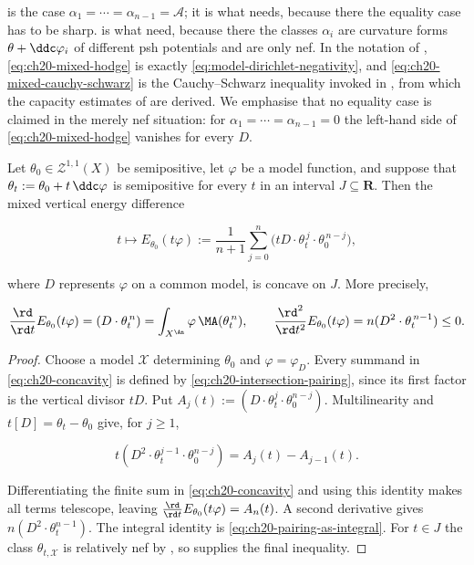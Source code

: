 \begin{remark}
\label{rem:ch20-hodge-uses}
 is the case
$\alpha_1=\cdots=\alpha_{n-1}=\mathcal A$; it is what
 needs, because there the equality case has to be
sharp.   is what
 need, because there the
classes $\alpha_i$ are curvature forms $\theta+\ddc\varphi_i$ of
different psh potentials and are only nef.  In the notation of
, \eqref{eq:ch20-mixed-hodge} is
exactly \eqref{eq:model-dirichlet-negativity}, and
\eqref{eq:ch20-mixed-cauchy-schwarz} is the Cauchy--Schwarz inequality
invoked in , from which the capacity
estimates of  are derived.  We emphasise that no
equality case is claimed in the merely nef situation: for
$\alpha_1=\cdots=\alpha_{n-1}=0$ the left-hand side of
\eqref{eq:ch20-mixed-hodge} vanishes for every $D$.
\end{remark}

\begin{corollary}
\label{cor:ch20-concavity}
Let $\theta_0\in\mathcal Z^{1,1}(X)$ be semipositive, let $\varphi$ be a
model function, and suppose that $\theta_t:=\theta_0+t\,\ddc\varphi$ is
semipositive for every $t$ in an interval $J\subseteq\mathbf R$.  Then
the mixed vertical energy difference

\begin{equation}
\label{eq:ch20-concavity}
 t\longmapsto E_{\theta_0}(t\varphi)
 :=\frac1{n+1}\sum_{j=0}^n
   \bigl(tD\cdot\theta_t^{\,j}\cdot\theta_0^{\,n-j}\bigr),
\end{equation}

where $D$ represents $\varphi$ on a common model, is concave on $J$.
More precisely,

\[
 \frac{\rd}{\rd t}E_{\theta_0}(t\varphi)
   =(D\cdot\theta_t^{\,n})
   =\int_{X^{\An}}\varphi\,\MA(\theta_t^{\,n}),
 \qquad
 \frac{\rd^2}{\rd t^2}E_{\theta_0}(t\varphi)
   =n(D^2\cdot\theta_t^{\,n-1})\leq0.
\]
\end{corollary}

\begin{proof}
Choose a model $\mathcal X$ determining $\theta_0$ and
$\varphi=\varphi_D$.  Every summand in
\eqref{eq:ch20-concavity} is defined by
\eqref{eq:ch20-intersection-pairing}, since its first factor is the vertical
divisor $tD$.  Put
$A_j(t):=(D\cdot\theta_t^j\cdot\theta_0^{n-j})$.  Multilinearity and
$t[D]=\theta_t-\theta_0$ give, for $j\geq1$,

\[
 t(D^2\cdot\theta_t^{j-1}\cdot\theta_0^{n-j})
 =A_j(t)-A_{j-1}(t).
\]

Differentiating the finite sum in \eqref{eq:ch20-concavity} and using this
identity makes all terms telescope, leaving
$\frac{\rd}{\rd t}E_{\theta_0}(t\varphi)=A_n(t)$.  A second derivative
gives $n(D^2\cdot\theta_t^{n-1})$.  The integral identity is
\eqref{eq:ch20-pairing-as-integral}.  For $t\in J$ the class
$\theta_{t,\mathcal X}$ is relatively nef by
, so
 supplies the final inequality.
\end{proof}

